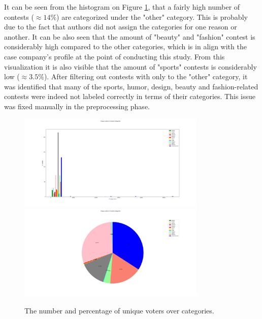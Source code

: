     It can be seen from the histogram on Figure \ref{user_engagement_in_categories}, that a fairly high number of contests ($\approx 14 \% $) are categorized under the "other" category. This is probably due to the fact that authors did not assign the categories for one reason or another. It can be also seen that the amount of "beauty" and "fashion" contest is considerably high compared to the other categories, which is in align with the case company's profile at the point of conducting this study. From this visualization it is also visible that the amount of "sports" contests is considerably low ($\approx 3.5 \% $). After filtering out contests with only to the "other" category, it was identified that many of the sports, humor, design, beauty and fashion-related contests were indeed not labeled correctly in terms of their categories. This issue was fixed manually in the preprocessing phase. 

    \begin{figure}[h] 
        \begin{center}
            \includegraphics[width=0.8\textwidth]{Images/user_engagement_in_categories_bar.png}
            \includegraphics[width=0.8\textwidth]{Images/user_engagement_in_categories_pie.png}
            \caption{The number and percentage of unique voters over categories.}
            \label{user_engagement_in_categories}
        \end{center}
    \end{figure}

